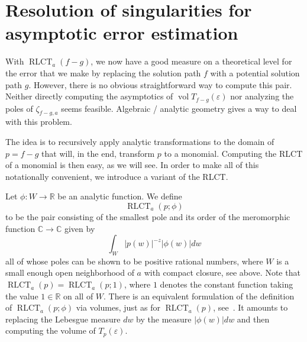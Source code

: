 \documentclass[11pt]{amsart}
\DeclareMathOperator{\rlct}{RLCT}
\numberwithin{equation}{section}
\theoremstyle{plain}
\theoremstyle{definition}
\newcommand{\C}{\mathbb{C}}
\newcommand{\R}{\mathbb{R}}
\begin{document}
 \section{Resolution of singularities for asymptotic error estimation}\label{sec:resolution} With $\rlct_a(f-g)$, we now have a good measure on a theoretical level for the error that we make by replacing the solution path $f$ with a potential solution path $g$. However, there is no obvious straightforward way to compute this pair. Neither directly computing the asymptotics of $\operatorname{vol} T_{f-g}(\varepsilon)$ nor analyzing the poles of $\zeta_{f-g,a}$ seems feasible. Algebraic / analytic geometry gives a way to deal with this problem.

 The idea is to recursively apply analytic transformations to the domain of $p = f-g$ that will, in the end, transform $p$ to a monomial. Computing the RLCT of a monomial is then easy, as we will see. In order to make all of this notationally convenient, we introduce a variant of the RLCT.

 Let $\phi: W \to \R$ be an analytic function. We define 
 \[
\rlct_a(p;\phi) 
 \]
to be the pair consisting of the smallest pole and its order of the meromorphic function $\C \to \C$ given by
\[
\int_W |p(w)|^{-z} |\phi(w)|dw
\]
all of whose poles can be shown to be positive rational numbers, where $W$ is a small enough open neighborhood of $a$ with compact closure, see above. Note that $\rlct_a(p) = \rlct_a(p;1)$, where $1$ denotes the constant function taking the value $ 1\in \R$ on all of $W$. There is an equivalent formulation of the definition of $\rlct_a(p;\phi)$ via volumes, just as for $\rlct_a(p)$, see~\cite{Lin:tubes}. It amounts to replacing the Lebesgue measure $dw$ by the measure $|\phi(w)|dw$ and then computing the volume of $T_p(\varepsilon)$. 
\end{document}
